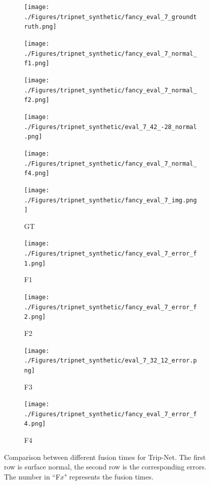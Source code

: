 \documentclass[border=15pt, multi, tikz]{article}
\begin{document}

\begin{figure}[H]
	\centering
	\begin{subfigure}[b]{0.18\linewidth}
		\texttt{[image: ./Figures/tripnet\_synthetic/fancy\_eval\_7\_groundtruth.png]}
	\end{subfigure}
	\begin{subfigure}[b]{0.18\linewidth}
		\texttt{[image: ./Figures/tripnet\_synthetic/fancy\_eval\_7\_normal\_f1.png]}
	\end{subfigure}
	\begin{subfigure}[b]{0.18\linewidth}
		\texttt{[image: ./Figures/tripnet\_synthetic/fancy\_eval\_7\_normal\_f2.png]}
	\end{subfigure}
	\begin{subfigure}[b]{0.18\linewidth}
		\texttt{[image: ./Figures/tripnet\_synthetic/eval\_7\_42\_-28\_normal.png]}
	\end{subfigure}
	\begin{subfigure}[b]{0.18\linewidth}
		\texttt{[image: ./Figures/tripnet\_synthetic/fancy\_eval\_7\_normal\_f4.png]}
	\end{subfigure}
	
	
		\begin{subfigure}[b]{0.18\linewidth}
		\texttt{[image: ./Figures/tripnet\_synthetic/fancy\_eval\_7\_img.png]}
		\caption{GT}
	\end{subfigure}
	\begin{subfigure}[b]{0.18\linewidth}
		\texttt{[image: ./Figures/tripnet\_synthetic/fancy\_eval\_7\_error\_f1.png]}
		\caption{F1}
	\end{subfigure}
	\begin{subfigure}[b]{0.18\linewidth}
		\texttt{[image: ./Figures/tripnet\_synthetic/fancy\_eval\_7\_error\_f2.png]}
		\caption{F2}
	\end{subfigure}
	\begin{subfigure}[b]{0.18\linewidth}
		\texttt{[image: ./Figures/tripnet\_synthetic/eval\_7\_32\_12\_error.png]}
		\caption{F3}
	\end{subfigure}
	\begin{subfigure}[b]{0.18\linewidth}
		\texttt{[image: ./Figures/tripnet\_synthetic/fancy\_eval\_7\_error\_f4.png]}
		\caption{F4}
	\end{subfigure}
	
	
	\caption{Comparison between different fusion times for Trip-Net. The first row is surface normal, the second row is the corresponding errors. The number in ``F$ x $" represents the fusion times. }
	\label{fig:tripnet-eval-synthetic-zoom-in}
\end{figure}
\end{document}
